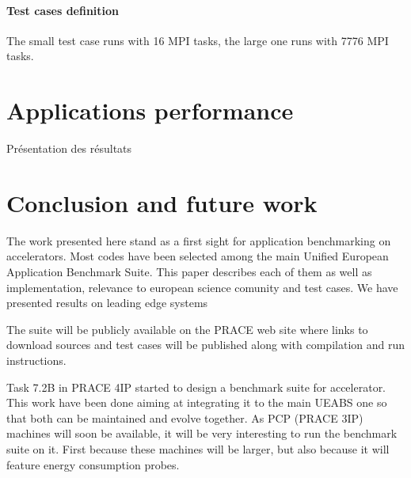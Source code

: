 \subsection{Test cases definition}
The small test case runs with 16 MPI tasks, the large one runs with 7776 MPI tasks.


\part{Applications performance}
Présentation des résultats

\part{Conclusion and future work}
The work presented here stand as a first sight for application benchmarking on accelerators. Most codes have been selected among the main Unified European Application Benchmark Suite. This paper describes each of them as well as implementation, relevance to european science comunity and test cases. We have presented results on leading edge systems

The suite will be publicly available on the PRACE web site where links to download sources and test cases will be published along with compilation and run instructions.

Task 7.2B in PRACE 4IP started to design a benchmark suite for accelerator. This work have been done aiming at integrating it to the main UEABS one so that both can be maintained and evolve together. As PCP (PRACE 3IP) machines will soon be available, it will be very interesting to run the benchmark suite on it. First because these machines will be larger, but also because it will feature energy consumption probes.


